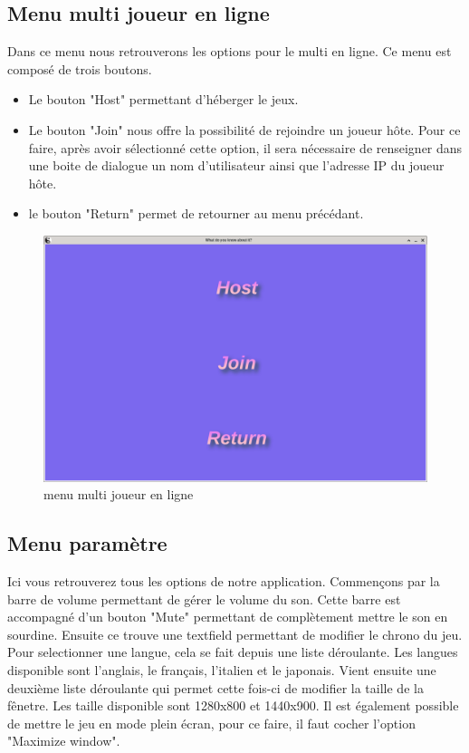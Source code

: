 \newpage
\subsection{Menu multi joueur en ligne}
Dans ce menu nous retrouverons les options pour le multi en ligne. Ce menu est composé de trois boutons.
\begin{itemize}
	\item Le bouton "Host" permettant d'héberger le jeux.
	\item Le bouton "Join" nous offre la possibilité de rejoindre un joueur hôte. Pour ce faire, après avoir 
		sélectionné cette option, il sera nécessaire de renseigner dans une boite de dialogue  un nom 
		d'utilisateur ainsi que l'adresse IP du joueur hôte.
	\item le bouton "Return" permet de retourner au menu précédant.
\end{itemize}

\begin{figure}[h]
	\centering
	\includegraphics[width=\textwidth]{menuonline.png}
	\caption{menu multi joueur en ligne}
	\label{fig:menu_multi_en_ligne}
\end{figure}

\newpage
\subsection{Menu paramètre}
Ici vous retrouverez tous les options de notre application. Commençons par la barre de volume permettant de gérer 
le volume du son. Cette barre est accompagné d'un bouton "Mute" permettant de complètement mettre le son en 
sourdine. Ensuite ce trouve une textfield permettant de modifier le chrono du jeu. Pour selectionner une langue,
cela se fait depuis une liste déroulante. Les langues disponible sont l'anglais, le français, l'italien et le 
japonais. Vient ensuite une deuxième liste déroulante qui permet cette fois-ci de modifier la taille de la fênetre. Les taille disponible sont 1280x800 et 1440x900. Il est également possible de mettre le jeu en mode plein écran, pour ce faire, il faut cocher l'option "Maximize window".

